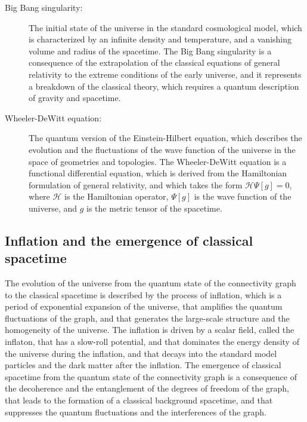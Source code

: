 \begin{tcolorbox}[colback=blue!5!white,colframe=blue!75!black,title=New terms]
    \begin{description}
        \item[Big Bang singularity:] The initial state of the universe in the standard cosmological model, which is characterized by an infinite density and temperature, and a vanishing volume and radius of the spacetime. The Big Bang singularity is a consequence of the extrapolation of the classical equations of general relativity to the extreme conditions of the early universe, and it represents a breakdown of the classical theory, which requires a quantum description of gravity and spacetime.
        \item[Wheeler-DeWitt equation:] The quantum version of the Einstein-Hilbert equation, which describes the evolution and the fluctuations of the wave function of the universe in the space of geometries and topologies. The Wheeler-DeWitt equation is a functional differential equation, which is derived from the Hamiltonian formulation of general relativity, and which takes the form $\mathcal{H}\Psi[g] = 0$, where $\mathcal{H}$ is the Hamiltonian operator, $\Psi[g]$ is the wave function of the universe, and $g$ is the metric tensor of the spacetime.
    \end{description}
\end{tcolorbox}

\subsection{Inflation and the emergence of classical spacetime}
The evolution of the universe from the quantum state of the connectivity graph to the classical spacetime is described by the process of inflation, which is a period of exponential expansion of the universe, that amplifies the quantum fluctuations of the graph, and that generates the large-scale structure and the homogeneity of the universe. The inflation is driven by a scalar field, called the inflaton, that has a slow-roll potential, and that dominates the energy density of the universe during the inflation, and that decays into the standard model particles and the dark matter after the inflation. The emergence of classical spacetime from the quantum state of the connectivity graph is a consequence of the decoherence and the entanglement of the degrees of freedom of the graph, that leads to the formation of a classical background spacetime, and that suppresses the quantum fluctuations and the interferences of the graph.

